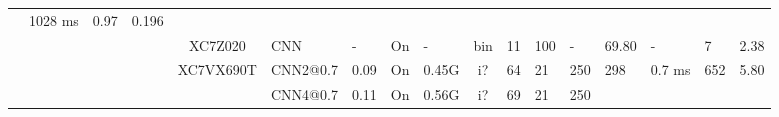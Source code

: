 \documentclass{article}
\begin{document}
\begin{table}
\begin{adjustbox}{totalheight=\baselineskip,}
\begin{tabular}{ccccclp{2em}cp{3em}cp{2em}p{4em}p{3em}p{3.5em}p{3.5em}p{2.5em}p{3em}}
                                                       &\multirow{1}{*}{1028 ms}
                                                           &\multirow{1}{*}{0.97}
                                                               &\multirow{1}{*}{0.196}\\
\cmidrule{4-17}
   &   &   &\multirow{1}{*}{\cite{wangAccelerationImplementationConvolutional2019}}
               &\multirow{1}{*}{XC7Z020}
                   &\multirow{1}{*}{CNN}
                       &\multirow{1}{*}{-}
                           &\multirow{1}{*}{On}
                               &\multirow{1}{*}{-}
                                   &\multirow{1}{*}{bin}
                                       &\multirow{1}{*}{11}
                                           &\multirow{1}{*}{100}
                                               &\multirow{1}{*}{-}
                                                   &\multirow{1}{*}{69.80}
                                                       &\multirow{1}{*}{-}
                                                           &\multirow{1}{*}{7}
                                                               &\multirow{1}{*}{2.38}\\
\cmidrule{4-17}
   &   &   &\multirow{3}{*}{\cite{yangAlgorithmHardwareCodesign2022}}
               &\multirow{3}{*}{XC7VX690T}
                   &\multirow{1}{*}{CNN2@0.7}
                       &\multirow{1}{*}{0.09}
                           &\multirow{1}{*}{On}
                               &\multirow{1}{*}{0.45G}
                                   &\multirow{1}{*}{i?}
                                       &\multirow{1}{*}{64}
                                           &\multirow{1}{*}{21}
                                               &\multirow{1}{*}{250}
                                                   &\multirow{1}{*}{298}
                                                       &\multirow{1}{*}{0.7 ms}
                                                           &\multirow{1}{*}{652}
                                                               &\multirow{1}{*}{5.80}\\
   &   &   &   &   &\multirow{1}{*}{CNN4@0.7}
                       &\multirow{1}{*}{0.11}
                           &\multirow{1}{*}{On}
                               &\multirow{1}{*}{0.56G}
                                   &\multirow{1}{*}{i?}
                                       &\multirow{1}{*}{69}
                                           &\multirow{1}{*}{21}
                                               &\multirow{1}{*}{250}

\end{tabular}
\end{adjustbox}
\end{table}
\end{document}
